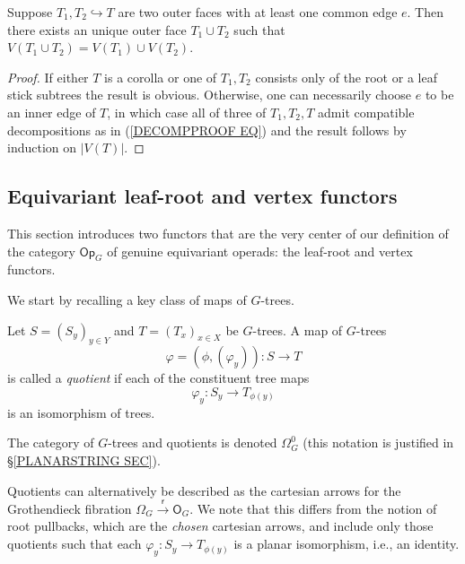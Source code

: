 \documentclass[a4paper,10pt]{article}%
\begin{document}
\begin{lemma}\label{OUTERFACEUNION LEM}
	Suppose $T_1,T_2 \hookrightarrow T$ are two outer faces with at least one common edge $e$. Then there exists an unique outer face $T_1 \cup T_2$ such that 
	$V(T_1 \cup T_2) = V(T_1) \cup V(T_2)$.
\end{lemma}

\begin{proof}
	If either $T$ is a corolla or one of $T_1,T_2$ consists only of the root or a leaf  stick subtrees the result is obvious.
	Otherwise, one can necessarily choose $e$ to be an inner edge of $T$, in which case all of three of $T_1,T_2,T$ admit compatible decompositions as in (\ref{DECOMPPROOF EQ}) and the result follows by induction on $|V(T)|$.
\end{proof}



\subsection{Equivariant leaf-root and vertex functors}\label{LRVERT SEC}


This section introduces two functors that are the very center of our definition of the category $\mathsf{Op}_G$ of
genuine equivariant operads: the leaf-root and vertex functors.

We start by recalling a key class of maps of $G$-trees.


\begin{definition}\label{QUOT DEF}
	Let $S = (S_y)_{y \in Y}$ and $T = (T_x)_{x \in X}$
	be $G$-trees.
	A map of $G$-trees 
	\[
	\varphi = (\phi, (\varphi_y))\colon S \to T
	\]
	is called a \textit{quotient} if each of the constituent tree maps
	\[
	\varphi_y \colon S_y \to T_{\phi(y)}
	\]
is an isomorphism of trees.	

The category of $G$-trees and quotients is denoted $\Omega_{G}^0$ (this notation is justified in \S \ref{PLANARSTRING SEC}).
\end{definition}


\begin{remark}
	Quotients can alternatively be described as the cartesian arrows for the Grothendieck fibration
	$\Omega_G \xrightarrow{\mathsf{r}} \mathsf{O}_G$.
	We note that this differs from the notion of root pullbacks, which are the \textit{chosen} cartesian arrows, and include only those quotients such that each
	$\varphi_y \colon S_y \to T_{\phi(y)}$
	is a planar isomorphism, i.e., an identity.
\end{remark}
\end{document}
